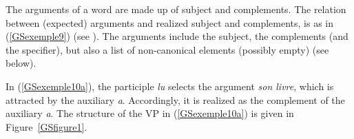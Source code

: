 \documentclass[output=paper
                ,modfonts
                ,nonflat
	        ,collection
	        ,collectionchapter
	        ,collectiontoclongg
 	        ,biblatex
                ,babelshorthands
                ,newtxmath
                ,draftmode
                ,colorlinks, citecolor=brown
]{./langsci/langscibook}
\begin{document}
{The arguments of a word are made up of subject and complements. The relation between (expected) arguments and realized subject and complements, is as in (\ref{GSexemple9}) (see \citealt{GSag2000a-u, BMS2001a-unlinked}). The arguments include the subject, the complements (and the specifier), but also a list of non-canonical elements (possibly empty) (see below).

\begin{exe}
\end{exe}

In (\ref{GSexemple10a}), the participle \emph{lu} selects the argument \emph{son livre}, which is attracted by the auxiliary \emph{a}.
Accordingly, it is realized as the complement of the auxiliary \emph{a}. The structure of the VP in (\ref{GSexemple10a}) is given in Figure~\ref{GSfigure1}.

\eal
	\label{GSexemple10}
	\label{GSexemple10a}
		
	\label{GSexemple10b}
\zl


}
\end{document}

